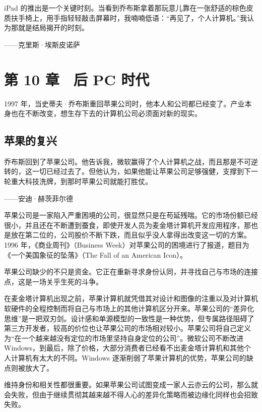 \documentclass[12pt,UTF8]{ctexbook}
\begin{document}
iPad 的推出是一个关键时刻。当看到乔布斯拿着那玩意儿靠在一张舒适的棕色皮质扶手椅上，用手指轻轻敲击屏幕时，我喃喃低语：“再见了，个人计算机。”我认为那就是结局揭开的时刻。

——克里斯·埃斯皮诺萨





\chapter{第 10 章　后 PC 时代}


1997 年，当史蒂夫·乔布斯重回苹果公司时，他本人和公司都已经变了。产业本身也在不断改变，想生存下去的计算机公司必须面对新的现实。





\section{苹果的复兴}


乔布斯回到了苹果公司。他告诉我，微软赢得了个人计算机之战，而且那是不可逆转的，这一切已经过去了。但他认为，如果他能让苹果公司足够强健，支撑到下一轮重大科技洗牌，到那时苹果公司就能打胜仗。

——安迪·赫茨菲尔德



苹果公司是一家陷入严重困境的公司，很显然只是在苟延残喘。它的市场份额已经很小，并且还在不断遭到蚕食，即使开发人员为麦金塔计算机开发应用程序，那也是放在第二位的，公司股价不断下跌，而且似乎没人拿得出改变这一切的方案。1996 年，《商业周刊》（Business Week）对苹果公司的困境进行了报道，题目为《一个美国象征的坠落》（The Fall of an American Icon）。

苹果公司缺少的不只是资金。它正在重新寻求身份认同，并寻找自己与市场的连接点，这是一场关乎生死的斗争。

在麦金塔计算机出现之前，苹果计算机就凭借其对设计和图像的注重以及对计算机软硬件的全程控制而将自己与市场上的其他计算机区分开来。苹果公司的“差异化思维”是一把双刃剑。设计感和单源模型的一致性是一种优势，但专属路径阻碍了第三方开发者，较高的价位也让苹果公司的市场相对较小。苹果公司将自己定义为“在一个越来越没有定位的市场里坚持自身定位的公司”。微软公司不断改进 Windows，到最后，除了价格，大部分消费者已经看不出麦金塔计算机和其他个人计算机有太大的不同。Windows 逐渐削弱了苹果计算机的优势，苹果公司的缺点则被放大了。

维持身份和相关性都很重要。如果苹果公司试图变成一家人云亦云的公司，那么就会失败，但由于继续贯彻其越来越不得人心的差异化策略而被边缘化同样也会招致失败。
\end{document}
